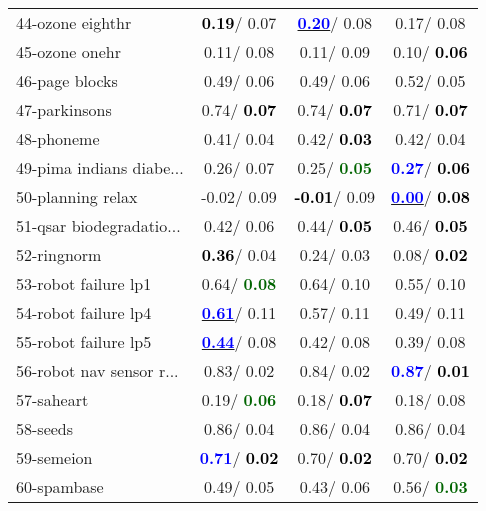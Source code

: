 \begin{table}[h]
\begin{center}
\begin{tabular}{lc|c|c}
44-ozone eighthr & \textcolor{black}{\textbf{  0.19}}/  0.07 & \underline{\textcolor{blue}{\textbf{  0.20}}}/  0.08 &   0.17/  0.08 \\
45-ozone onehr &   0.11/  0.08 &   0.11/  0.09 &   0.10/\textcolor{black}{\textbf{  0.06}} \\
46-page blocks &   0.49/  0.06 &   0.49/  0.06 &   0.52/  0.05 \\ \hline
47-parkinsons &   0.74/\textcolor{black}{\textbf{  0.07}} &   0.74/\textcolor{black}{\textbf{  0.07}} &   0.71/\textcolor{black}{\textbf{  0.07}} \\
48-phoneme &   0.41/  0.04 &   0.42/\textcolor{black}{\textbf{  0.03}} &   0.42/  0.04 \\
49-pima indians diabe... &   0.26/  0.07 &   0.25/\textcolor{darkgreen}{\textbf{  0.05}} & \textcolor{blue}{\textbf{  0.27}}/\textcolor{black}{\textbf{  0.06}} \\
50-planning relax &  -0.02/  0.09 & \textcolor{black}{\textbf{ -0.01}}/  0.09 & \underline{\textcolor{blue}{\textbf{  0.00}}}/\textcolor{black}{\textbf{  0.08}} \\
51-qsar biodegradatio... &   0.42/  0.06 &   0.44/\textcolor{black}{\textbf{  0.05}} &   0.46/\textcolor{black}{\textbf{  0.05}} \\
52-ringnorm & \textcolor{black}{\textbf{  0.36}}/  0.04 &   0.24/  0.03 &   0.08/\textcolor{black}{\textbf{  0.02}} \\
53-robot failure lp1 &   0.64/\textcolor{darkgreen}{\textbf{  0.08}} &   0.64/  0.10 &   0.55/  0.10 \\ \hline
54-robot failure lp4 & \underline{\textcolor{blue}{\textbf{  0.61}}}/  0.11 &   0.57/  0.11 &   0.49/  0.11 \\
55-robot failure lp5 & \underline{\textcolor{blue}{\textbf{  0.44}}}/  0.08 &   0.42/  0.08 &   0.39/  0.08 \\
56-robot nav sensor r... &   0.83/  0.02 &   0.84/  0.02 & \textcolor{blue}{\textbf{  0.87}}/\textcolor{black}{\textbf{  0.01}} \\
57-saheart &   0.19/\textcolor{darkgreen}{\textbf{  0.06}} &   0.18/\textcolor{black}{\textbf{  0.07}} &   0.18/  0.08 \\
58-seeds &   0.86/  0.04 &   0.86/  0.04 &   0.86/  0.04 \\
59-semeion & \textcolor{blue}{\textbf{  0.71}}/\textcolor{black}{\textbf{  0.02}} &   0.70/\textcolor{black}{\textbf{  0.02}} &   0.70/\textcolor{black}{\textbf{  0.02}} \\
60-spambase &   0.49/  0.05 &   0.43/  0.06 &   0.56/\textcolor{darkgreen}{\textbf{  0.03}} \\ \hline

\end{tabular}
\end{center}
\end{table}
